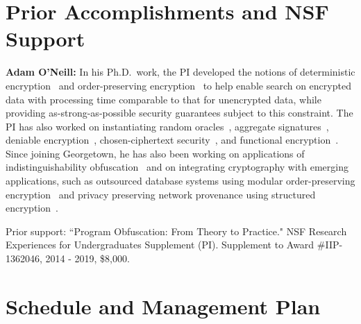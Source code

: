 \documentclass[11pt]{article}
\theoremstyle{remark}
\begin{document}
\section{Prior Accomplishments and NSF Support}

\textbf{Adam O'Neill:}
In his Ph.D.~work, the PI  developed the notions of deterministic encryption~\cite{C:BelBolOne07,ABO07,C:BolFehOne08,C:BFOR08,TCC:FulNeiRey12} and order-preserving encryption~\cite{EC:BCLO09,C:BolCheOne11} to help enable search on encrypted data with processing time comparable to that for unencrypted data, while providing as-strong-as-possible security guarantees subject to this constraint.
The PI has also worked on  instantiating random oracles~\cite{C:KilOneSmi10,TCC:GoyONeRao11,EC:LewONeSmi13},   aggregate signatures~\cite{CCS:BGOY07,AC:GLOW12}, deniable encryption~\cite{C:OnePeiWat11},  chosen-ciphertext security~\cite{EC:KilMohOne10,PKC:DFMO14}, and  functional encryption~\cite{EPRINT:ONeill10b,C:DIJOPP13, CANS:BelONe13}.   %
Since joining Georgetown, he has also been working on  applications of indistinguishability obfuscation~\cite{DGLOZ14} and on integrating cryptography with emerging applications, such as outsourced database systems using modular order-preserving encryption~\cite{SIGMOD:MCOKC15} and  privacy preserving network provenance using structured encryption~\cite{LOSZZ14}.

Prior support: ``Program Obfuscation: From Theory to Practice." NSF Research Experiences for Undergraduates Supplement (PI).
Supplement to Award \#IIP-1362046,   2014 - 2019, \$8,000.

\section{Schedule and Management Plan}



\end{document}
